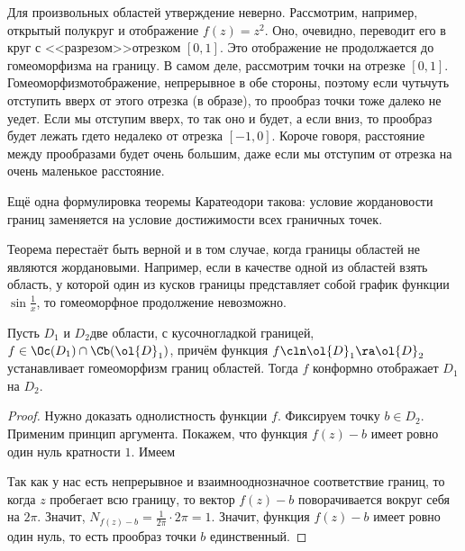\documentclass[a4paper]{article}
\begin{document}
\begin{note}
Для произвольных областей утверждение неверно. Рассмотрим, например, открытый полукруг и отображение $f(z)=z^2$.
Оно, очевидно, переводит его в круг с <<разрезом>>\т отрезком $[0,1]$. Это отображение не продолжается
до гомеоморфизма на границу.
В самом деле, рассмотрим точки на отрезке $[0,1]$. Гомеоморфизм\т отображение, непрерывное
в обе стороны, поэтому если чуть\д чуть отступить вверх от этого отрезка (в образе), то прообраз точки тоже далеко не уедет.
Если мы отступим вверх, то так оно и будет, а если вниз, то прообраз будет лежать где\д то недалеко от отрезка $[-1,0]$.
Короче говоря, расстояние между прообразами будет очень большим, даже если мы отступим от отрезка на очень маленькое
расстояние.
\end{note}

Ещё одна формулировка теоремы Каратеодори такова: условие жордановости
границ заменяется на условие достижимости всех граничных точек.

\begin{note}
Теорема  перестаёт быть верной и в том случае, когда границы областей не являются жордановыми. Например, если в качестве
одной из областей взять область, у которой один из кусков границы представляет собой график функции
$\sin \frac{1}{x}$, то гомеоморфное продолжение невозможно.
\end{note}

\begin{theorem}
Пусть $D_1$ и $D_2$\т две области, с кусочно\д гладкой границей, $f\in\Oc(D_1) \cap \Cb(\ol{D}_1)$,
причём функция $f\cln \ol{D}_1\ra \ol{D}_2$ устанавливает гомеоморфизм границ областей.
Тогда $f$ конформно отображает $D_1$ на $D_2$.
\end{theorem}
\begin{proof}
Нужно доказать однолистность функции $f$. Фиксируем точку $b \in D_2$.
Применим принцип аргумента. Покажем, что функция $f(z)-b$ имеет ровно один нуль кратности $1$. Имеем


Так как у нас есть непрерывное и взаимно\д однозначное соответствие границ, то когда $z$ пробегает всю границу, то
вектор $f(z)-b$ поворачивается вокруг себя на $2\pi$. Значит, $N_{f(z)-b} = \frac{1}{2\pi} \cdot2\pi =1$.
Значит, функция $f(z)-b$ имеет ровно один нуль, то есть прообраз точки $b$ единственный.
\end{proof}
\end{document}
